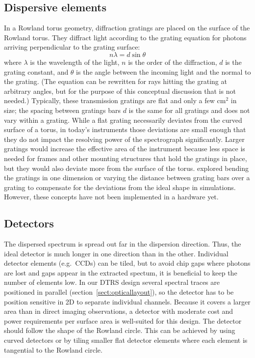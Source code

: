 \documentclass[linenumbers]{aastex631}
\begin{document}
\subsection{Dispersive elements}
In a Rowland torus geometry, diffraction gratings are placed on the surface of the Rowland torus. They diffract light according to the grating equation for photons arriving perpendicular to the grating surface:
\begin{equation}
n \lambda = d \sin \theta \label{eqn:diffraction}
\end{equation}
where $\lambda$ is the wavelength of the light, $n$ is the order of the diffraction, $d$ is the grating constant, and $\theta$ is the angle between the incoming light and the normal to the grating. (The equation can be rewritten for rays hitting the grating at arbitrary angles, but for the purpose of this conceptual discussion that is not needed.)
Typically, these transmission gratings are flat and only a few cm$^2$ in size; the spacing between gratings bars $d$ is the same for all gratings and does not vary within a grating. While a flat grating necessarily deviates from the curved surface of a torus, in today's instruments those deviations are small enough that they do not impact the resolving power of the spectrograph significantly. Larger gratings would increase the effective area of the instrument because less space is needed for frames and other mounting structures that hold the gratings in place, but they would also deviate more from the surface of the torus. \citet{2020SPIE11444E..88G} explored bending the gratings in one dimension or varying the distance between grating bars over a grating to compensate for the deviations from the ideal shape in simulations. However, these concepts have not been implemented in a hardware yet.


\subsection{Detectors}
The dispersed spectrum is spread out far in the dispersion direction. Thus, the ideal detector is much longer in one direction than in the other. Individual detector elements (e.g.\ CCDs) can be tiled, but to avoid chip gaps where photons are lost and gaps appear in the extracted spectum, it is beneficial to keep the number of elements low. In our DTRS design several spectral traces are positioned in parallel (section~\ref{sect:opticallayout}), so the detector has to be position sensitive in 2D to separate individual channels.  Because it covers a larger area than in direct imaging observations, a detector with moderate cost and power requirements per surface area is well-suited for this design. The detector should follow the shape of the Rowland circle. This can be achieved by using curved detectors or by tiling smaller flat detector elements where each element is tangential to the Rowland circle.
\end{document}
